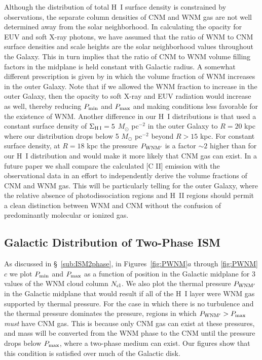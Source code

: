\documentclass[12pt,preprint,flushrt]{aastex}
\begin{document}
Although the distribution of total H~I surface density is constrained by
observations, the separate column densities of CNM and WNM gas are not well
determined away from the solar neighborhood.
In calculating the opacity for EUV and soft X-ray photons,
we have assumed that the ratio of WNM to CNM surface densities and
scale heights are the  solar neighborhood
values \citep{dic90} throughout the Galaxy.
This in turn implies that the ratio of CNM to WNM volume filling
factors in the midplane is held constant with Galactic radius.
A somewhat different  prescription is given by \cite{fer98}
in which the volume fraction of WNM increases in the outer Galaxy.
Note that if we allowed the WNM fraction to increase in the outer
Galaxy, then the opacity to soft X-ray and EUV radiation would
increase as well, thereby reducing $P_{\rm min}$ and $P_{\rm max}$
and making conditions less favorable for the existence of WNM.
Another difference in our H~I distributions is that 
\cite{fer98} used a constant surface density of 
$\Sigma_{\rm H\,I} = 5$ $M_\odot$ pc$^{-2}$ in the outer Galaxy to
$R=20$ kpc where our distribution drops below 
5 $M_\odot$ pc$^{-2}$ beyond $R >  15$ kpc.  For constant
surface density, at $R=18$ kpc the 
pressure $P_{\rm WNM'}$ is a factor $\sim 2$ higher than for our H~I
distribution and would make it more likely 
that CNM gas can exist.
In a future paper we shall compare the calculated
[C II] emission with the observational data in an effort to independently
derive the volume fractions of CNM and WNM gas.
This will be particularly telling for the outer Galaxy, where
the relative absence of photodissociation regions and
H~II regions should permit
a clean distinction between WNM and CNM without the confusion
of predominantly molecular or ionized gas.

\subsection{Galactic Distribution of Two-Phase ISM}
\label{sub:disc-distb}

As discussed in \S~\ref{sub:ISM2phase},
in Figures~\ref{fig:PWNM}$a$ through \ref{fig:PWNM}$c$ we plot
$P_{\rm min}$ and
$P_{\rm max}$ as a function of position in the Galactic midplane
for 3 values of the WNM cloud column $N_{\rm cl}$. We also plot the
thermal pressure $P_{\rm WNM'}$ in the Galactic midplane
that would result if all of the H~I layer were WNM gas supported by thermal
pressure. For the case
in which there is no turbulence
and the thermal pressure dominates the pressure,
regions in which
$P_{\rm WNM'} > P_{\rm max}$
{\em must} have CNM gas. This is because
only CNM gas can exist at these pressures, and mass will be converted
from the WNM phase to the CNM until the pressure drops below
$P_{\rm max}$, where a two-phase medium can exist. Our figures show that
this condition is satisfied over much of the Galactic disk.
\end{document}
